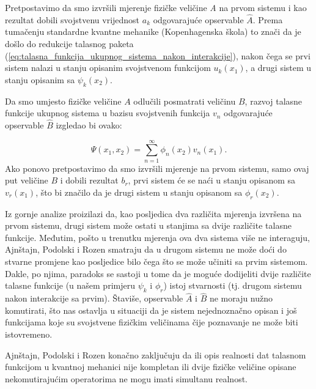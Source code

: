 Pretpostavimo da smo izvršili mjerenje fizičke veličine {\it{A}} na prvom sistemu i kao rezultat dobili svojstvenu vrijednost $a_k$ odgovarajuće opservable $\hat{A}$.
Prema tumačenju standardne kvantne mehanike (Kopenhagenska škola) to znači da je došlo do redukcije talasnog paketa (\ref{eq:talasna_funkcija_ukupnog_sistema_nakon_interakcije}), nakon čega se prvi sistem nalazi u stanju opisanim svojstvenom funkcijom $u_k(x_1)$, a drugi sistem u stanju opisanim sa $\psi_k(x_2)$.

Da smo umjesto fizičke veličine $A$ odlučili posmatrati veličinu $B$, razvoj talasne funkcije ukupnog sistema u bazisu svojstvenih funkcija $v_n$ odgovarajuće opservable $\hat{B}$ izgledao bi ovako:

\begin{equation}
    \Psi(x_1, x_2) = \sum_{n=1}^{\infty} \phi_n(x_2)v_n(x_1).
\end{equation}
Ako ponovo pretpostavimo da smo izvršili mjerenje na prvom sistemu, samo ovaj put veličine $B$ i dobili rezultat $b_r$, prvi sistem će se naći u stanju opisanom sa $v_r(x_1)$, što bi značilo da je drugi sistem u stanju opisanom sa $\phi_r(x_2)$.

Iz gornje analize proizilazi da, kao posljedica dva različita mjerenja izvršena na prvom sistemu,
drugi sistem može ostati u stanjima sa dvije različite talasne funkcije.
Međutim, pošto u trenutku mjerenja ova dva sistema više ne interaguju, Ajnštajn, Podolski i Rozen smatraju da u drugom sistemu ne može doći do stvarne promjene kao posljedice
bilo čega što se može učiniti sa prvim sistemom.
Dakle, po njima, paradoks se sastoji u tome da je moguće dodijeliti dvije različite talasne funkcije (u našem primjeru $\psi_k$ i $\phi_r$) istoj stvarnosti (tj. drugom sistemu nakon interakcije sa prvim).
Štaviše, opservable $\hat{A}$ i $\hat{B}$ ne moraju nužno komutirati, što nas ostavlja u situaciji da je sistem nejednoznačno opisan i još funkcijama koje su svojstvene fizičkim veličinama čije poznavanje ne može biti istovremeno.


Ajnštajn, Podolski i Rozen konačno zaključuju da ili opis realnosti dat talasnom funkcijom u kvantnoj mehanici nije kompletan
ili dvije fizičke veličine opisane nekomutirajućim operatorima ne mogu imati simultanu realnost.

